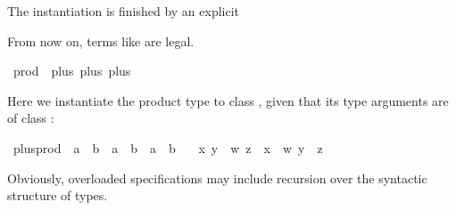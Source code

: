\begin{isabellebody}
\begin{isamarkuptext}
The instantiation is finished by an explicit%
\end{isamarkuptext}%
\isamarkuptrue%
\isamarkupfalse%
%
\begin{isamarkuptext}%
\noindent From now on, terms like  are
legal.%
\end{isamarkuptext}%
\isamarkuptrue%
\isamarkupfalse%
\ prod\ {}{}\ {}plus{}\ plus{}\ plus\isanewline
{}%
\begin{isamarkuptext}%
\noindent Here we instantiate the product type  to
class , given that its type arguments are of
class :%
\end{isamarkuptext}%
\isamarkuptrue%
\isamarkupfalse%
\ plus{}prod\ {}{}\ {}{}a\ {}\ {}b\ {}\ {}a\ {}\ {}b\ {}\ {}a\ {}\ {}b{}\ \isanewline
\ \ {}{}x{}\ y{}\ {}\ {}w{}\ z{}\ {}\ {}x\ {}\ w{}\ y\ {}\ z{}{}%
\begin{isamarkuptext}%
\noindent Obviously, overloaded specifications may include
recursion over the syntactic structure of types.%
\end{isamarkuptext}%

\end{isabellebody}
